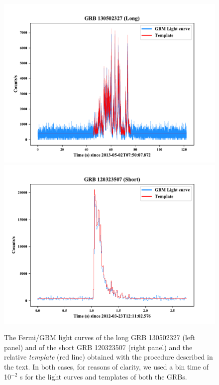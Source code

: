 \documentclass[]{spie}  %
\begin{document}
\begin{figure}[h!]
\centering
\includegraphics[scale=0.52,angle=0]{fig/Template_comparison_Long.pdf}
\includegraphics[scale=0.52,angle=0]{fig/Template_comparison_Short.pdf}

\caption{The Fermi/GBM light curves of the long GRB 130502327 (left panel) and of the short GRB 120323507 (right panel) and the relative \textit{template} (red line) obtained with the procedure described in the text. In both cases, for reasons of clarity, we used a bin time of 10$^{-2}$ s for the light curves and templates of both the GRBs.} 
\label{fig:template_short_long}
\end{figure}
\end{document}
